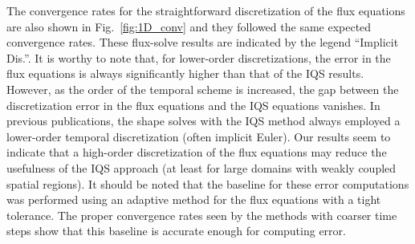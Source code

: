 \documentclass{elsarticle}
\newcommand{\fig}[1]{Fig.~\ref{#1}}                      %
\begin{document}
The convergence rates for the straightforward discretization of the flux equations are also shown in \fig{fig:1D_conv} and they followed the same expected convergence rates. These flux-solve results are indicated by the legend ``Implicit Dis.''. It is worthy to note that, for lower-order discretizations, the error in the flux equations is always significantly higher than that of the IQS results. However, as the order of the temporal scheme is increased, the gap between the discretization error in the flux equations and the IQS equations vanishes. In previous publications, the shape solves with the IQS method always employed a lower-order temporal discretization (often implicit Euler). Our results seem to indicate that a high-order discretization of the flux equations may reduce the usefulness of the IQS approach (at least for large domains with weakly coupled spatial regions). 
It should be noted that the baseline for these error computations was performed using an adaptive method for the flux equations with a tight tolerance. The proper convergence rates seen by the methods with coarser time steps show that this baseline is accurate enough for computing error.
\end{document}
